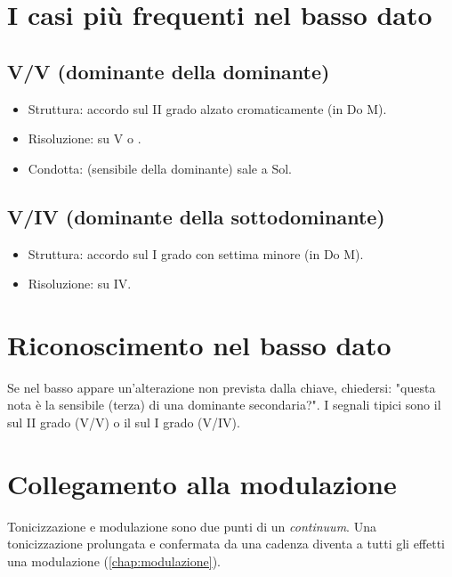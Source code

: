 \section{I casi più frequenti nel basso dato}
\label{sec:casi_frequenti}

\subsection{V/V (dominante della dominante)}
\begin{itemize}
    \item Struttura: accordo sul II grado alzato cromaticamente (\Fadiesis  in Do M).
    \item Risoluzione: su V o .
    \item Condotta: \Fadiesis  (sensibile della dominante) sale a Sol.
\end{itemize}

\subsection{V/IV (dominante della sottodominante)}
\begin{itemize}
    \item Struttura: accordo sul I grado con settima minore (\Sibemolle  in Do M).
    \item Risoluzione: su IV.
\end{itemize}

\section{Riconoscimento nel basso dato}
\label{sec:riconoscimento}

\begin{regola}
    Se nel basso appare un'alterazione non prevista dalla chiave, chiedersi: "questa nota è la sensibile (terza) di una dominante secondaria?". I segnali tipici sono il \Fadiesis  sul II grado (V/V) o il \Sibemolle  sul I grado (V/IV).
\end{regola}

\section{Collegamento alla modulazione}
\label{sec:collegamento_mod}

Tonicizzazione e modulazione sono due punti di un \textit{continuum}. Una tonicizzazione prolungata e confermata da una cadenza diventa a tutti gli effetti una modulazione (\ref{chap:modulazione}).
